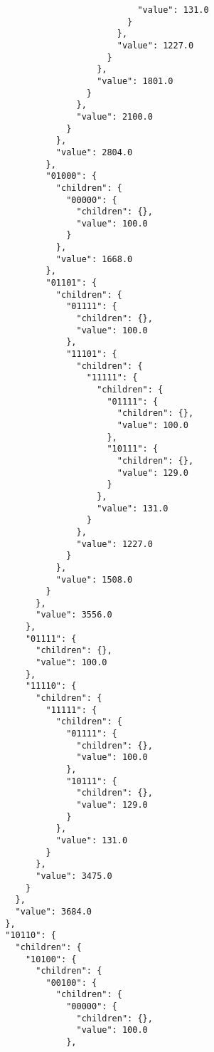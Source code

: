\documentclass{article}
\begin{document}
\begin{listing}
\begin{verbatim}
                                  "value": 131.0
                                }
                              },
                              "value": 1227.0
                            }
                          },
                          "value": 1801.0
                        }
                      },
                      "value": 2100.0
                    }
                  },
                  "value": 2804.0
                },
                "01000": {
                  "children": {
                    "00000": {
                      "children": {},
                      "value": 100.0
                    }
                  },
                  "value": 1668.0
                },
                "01101": {
                  "children": {
                    "01111": {
                      "children": {},
                      "value": 100.0
                    },
                    "11101": {
                      "children": {
                        "11111": {
                          "children": {
                            "01111": {
                              "children": {},
                              "value": 100.0
                            },
                            "10111": {
                              "children": {},
                              "value": 129.0
                            }
                          },
                          "value": 131.0
                        }
                      },
                      "value": 1227.0
                    }
                  },
                  "value": 1508.0
                }
              },
              "value": 3556.0
            },
            "01111": {
              "children": {},
              "value": 100.0
            },
            "11110": {
              "children": {
                "11111": {
                  "children": {
                    "01111": {
                      "children": {},
                      "value": 100.0
                    },
                    "10111": {
                      "children": {},
                      "value": 129.0
                    }
                  },
                  "value": 131.0
                }
              },
              "value": 3475.0
            }
          },
          "value": 3684.0
        },
        "10110": {
          "children": {
            "10100": {
              "children": {
                "00100": {
                  "children": {
                    "00000": {
                      "children": {},
                      "value": 100.0
                    },

\end{verbatim}
\end{listing}
\end{document}
